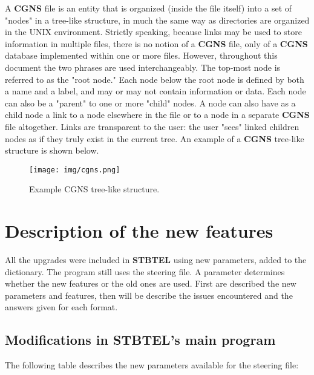 \documentclass[a4paper,10pt]{article}
\newcommand{\stb}{\textbf{STBTEL}\xspace}
\newcommand{\cgns}{\textbf{CGNS}\xspace}
\begin{document}
A \cgns file is an entity that is organized (inside the file itself) into a set of "nodes" 
in a tree-like structure, in much the same way as directories are organized in the UNIX environment. 
Strictly speaking, because links may be used to store information in multiple files, there is no notion 
of a \cgns file, only of a \cgns database implemented within one or more files. 
However, throughout this document the two phrases are used interchangeably. The top-most node is 
referred to as the "root node." Each node below the root node is defined by both a name and a label, 
and may or may not contain information or data. Each node can also be a "parent" to one or more "child" nodes. 
A node can also have as a child node a link to a node elsewhere in the file or to a node in a separate 
\cgns file altogether. Links are transparent to the user: the user "sees" linked children nodes as 
if they truly exist in the current tree. An example of a \cgns tree-like structure is shown below.

\begin{figure} [ht]
\centering
\texttt{[image: img/cgns.png]}
\caption{Example CGNS tree-like structure.}
\end{figure}


\section{\label{upgrades}Description of the new features}

All the upgrades were included in \stb using new parameters, added to the dictionary. The program still
uses the steering file. A parameter determines whether the new features or the old ones are used.
First are described the new parameters and features, then will be describe the issues encountered and the answers given for each format.

\subsection{Modifications in \stb's main program}

The following table describes the new parameters available for the steering file:\\
\end{document}
